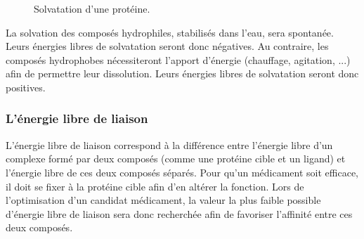 \begin{figure}[ht]
  \center
      \caption{Solvatation d'une protéine.}
      \label{fig:solvatation_def}
\end{figure}


La solvation des composés hydrophiles, stabilisés dans l'eau, sera spontanée. Leurs énergies libres de solvatation seront donc négatives. Au contraire, les composés hydrophobes nécessiteront l'apport d'énergie (chauffage, agitation, ...) afin de permettre leur dissolution. Leurs énergies libres de solvatation seront donc positives. 

\subsubsection{L'énergie libre de liaison}
L'énergie libre de liaison correspond à la différence  entre l'énergie libre d'un complexe formé par deux composés (comme une protéine cible et un ligand) et l'énergie libre de ces deux composés séparés. Pour qu'un médicament soit efficace, il doit se fixer à la protéine cible afin d'en altérer la fonction. Lors de l'optimisation d'un candidat médicament, la valeur la plus faible possible d'énergie libre de liaison sera donc recherchée afin de favoriser l'affinité entre ces deux composés.





